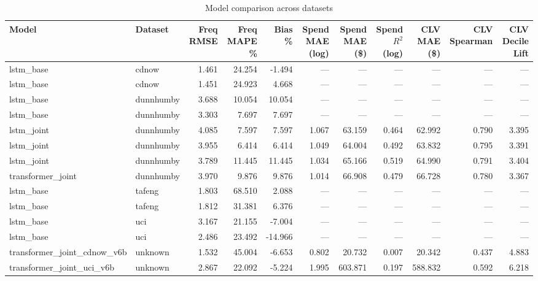 \begin{table}
\caption{Model comparison across datasets}
\label{tab:model_comparison}
\begin{tabular}{llrrrrrrrrr}
\toprule
Model & Dataset & Freq RMSE & Freq MAPE \% & Bias \% & Spend MAE (log) & Spend MAE (\$) & Spend $R^2$ (log) & CLV MAE (\$) & CLV Spearman & CLV Decile Lift \\
\midrule
lstm_base & cdnow & 1.461 & 24.254 & -1.494 & — & — & — & — & — & — \\
lstm_base & cdnow & 1.451 & 24.923 & 4.668 & — & — & — & — & — & — \\
lstm_base & dunnhumby & 3.688 & 10.054 & 10.054 & — & — & — & — & — & — \\
lstm_base & dunnhumby & 3.303 & 7.697 & 7.697 & — & — & — & — & — & — \\
lstm_joint & dunnhumby & 4.085 & 7.597 & 7.597 & 1.067 & 63.159 & 0.464 & 62.992 & 0.790 & 3.395 \\
lstm_joint & dunnhumby & 3.955 & 6.414 & 6.414 & 1.049 & 64.004 & 0.492 & 63.832 & 0.795 & 3.391 \\
lstm_joint & dunnhumby & 3.789 & 11.445 & 11.445 & 1.034 & 65.166 & 0.519 & 64.990 & 0.791 & 3.404 \\
transformer_joint & dunnhumby & 3.970 & 9.876 & 9.876 & 1.014 & 66.908 & 0.479 & 66.728 & 0.780 & 3.367 \\
lstm_base & tafeng & 1.803 & 68.510 & 2.088 & — & — & — & — & — & — \\
lstm_base & tafeng & 1.812 & 31.381 & 6.376 & — & — & — & — & — & — \\
lstm_base & uci & 3.167 & 21.155 & -7.004 & — & — & — & — & — & — \\
lstm_base & uci & 2.486 & 23.492 & -14.966 & — & — & — & — & — & — \\
transformer_joint_cdnow_v6b & unknown & 1.532 & 45.004 & -6.653 & 0.802 & 20.732 & 0.007 & 20.342 & 0.437 & 4.883 \\
transformer_joint_uci_v6b & unknown & 2.867 & 22.092 & -5.224 & 1.995 & 603.871 & 0.197 & 588.832 & 0.592 & 6.218 \\
\bottomrule
\end{tabular}
\end{table}
